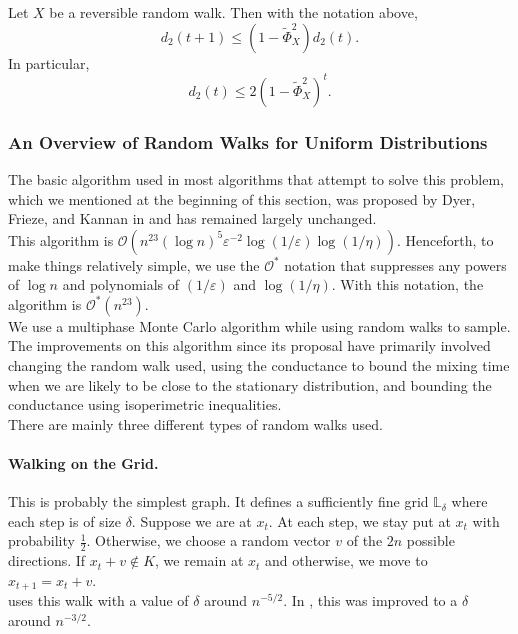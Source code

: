 \begin{ftheo}
\label{large conductance implies rapidly mixing}
Let $X$ be a reversible random walk. Then with the notation above,
\[ d_2(t+1) \leq (1-\tilde{\Phi}_X^2)d_2(t). \]
In particular,
\[ d_2(t) \leq 2(1-\tilde{\Phi}_X^2)^t. \]
\end{ftheo}

\subsubsection{An Overview of Random Walks for Uniform Distributions}

The basic algorithm used in most algorithms that attempt to solve this problem, which we mentioned at the beginning of this section, was proposed by Dyer, Frieze, and Kannan in \cite{dyer-frieze-kannan} and has remained largely unchanged.\\
This algorithm is $\mathcal{O}(n^{23}(\log n)^5\varepsilon^{-2}\log(1/\varepsilon)\log(1/\eta))$. Henceforth, to make things relatively simple, we use the $\mathcal{O}^*$ notation that suppresses any powers of $\log n$ and polynomials of $(1/\varepsilon)$ and $\log(1/\eta)$. With this notation, the algorithm is $\mathcal{O}^*(n^{23})$.\\

We use a multiphase Monte Carlo algorithm while using random walks to sample. The improvements on this algorithm since its proposal have primarily involved changing the random walk used, using the conductance to bound the mixing time when we are likely to be close to the stationary distribution, and bounding the conductance using isoperimetric inequalities.\\

There are mainly three different types of random walks used.

\paragraph{Walking on the Grid.}

This is probably the simplest graph. It defines a sufficiently fine grid $\mathbb{L}_\delta$ where each step is of size $\delta$. Suppose we are at $x_t$. At each step, we stay put at $x_t$ with probability $\frac{1}{2}$. Otherwise, we choose a random vector $v$ of the $2n$ possible directions. If $x_t+v\not\in K$, we remain at $x_t$ and otherwise, we move to $x_{t+1}=x_t+v$.\\
\cite{dyer-frieze-kannan} uses this walk with a value of $\delta$ around $n^{-5/2}$. In \cite{lovasz-simonovits-mixing-rate-isoperimetric}, this was improved to a $\delta$ around $n^{-3/2}$.

